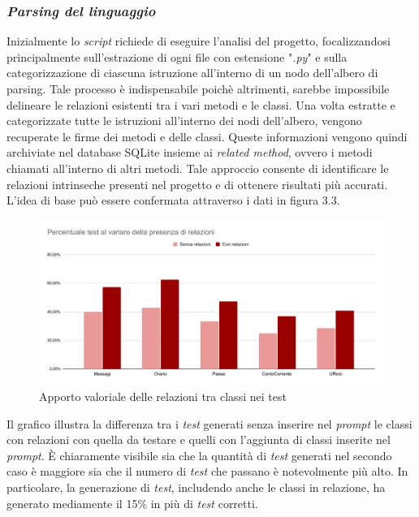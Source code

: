     \subsubsection{\textit{Parsing del linguaggio}}
    Inizialmente lo \textit{script} richiede di eseguire l'analisi del progetto, focalizzandosi principalmente sull'estrazione di ogni file con estensione "\textit{.py}"
    e sulla categorizzazione di ciascuna istruzione all'interno di un nodo dell'albero di parsing. Tale processo è indispensabile poichè altrimenti, sarebbe 
    impossibile delineare le relazioni esistenti tra i vari metodi e le classi.
    Una volta estratte e categorizzate tutte le istruzioni all'interno dei nodi dell'albero, vengono recuperate le firme dei metodi e delle classi. 
    Queste informazioni vengono quindi archiviate nel database SQLite insieme ai \textit{related method}, ovvero i metodi chiamati all'interno di altri metodi. 
    Tale approccio consente di identificare le relazioni intrinseche presenti nel progetto e di ottenere risultati più accurati.
    L'idea di base può essere confermata attraverso i dati in figura 3.3.
    \begin{figure}[htp]
        \centering        
        \includegraphics[width=14.5cm]{img/Percentuale test al variare della presenza di relazioni.pdf}
        \caption{Apporto valoriale delle relazioni tra classi nei test}
    \end{figure}\newline
     Il grafico illustra la differenza tra i \textit{test} generati senza inserire nel \textit{prompt} le classi con relazioni con quella da testare e quelli 
    con l'aggiunta di classi inserite nel \textit{prompt}. È chiaramente visibile sia che la quantità di \textit{test} generati nel secondo caso è maggiore sia che il numero di \textit{test} che passano è notevolmente più alto.
    In particolare, la generazione di \textit{test}, includendo anche le classi in relazione, ha generato mediamente il 15\% in più di \textit{test} corretti.

